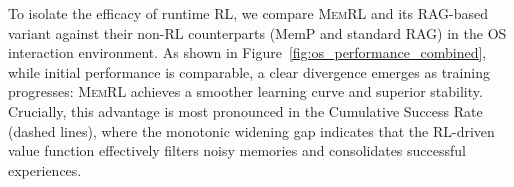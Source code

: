 \documentclass{article}
\theoremstyle{plain}
\theoremstyle{definition}
\theoremstyle{remark}
\begin{document}
To isolate the efficacy of runtime RL, we compare \textsc{MemRL} and its RAG-based variant against their non-RL counterparts (MemP and standard RAG) in the OS interaction environment. As shown in Figure~\ref{fig:os_performance_combined}, while initial performance is comparable, a clear divergence emerges as training progresses: \textsc{MemRL} achieves a smoother learning curve and superior stability.
Crucially, this advantage is most pronounced in the Cumulative Success Rate (dashed lines), where the monotonic widening gap indicates that the RL-driven value function effectively filters noisy memories and consolidates successful experiences.









\end{document}
